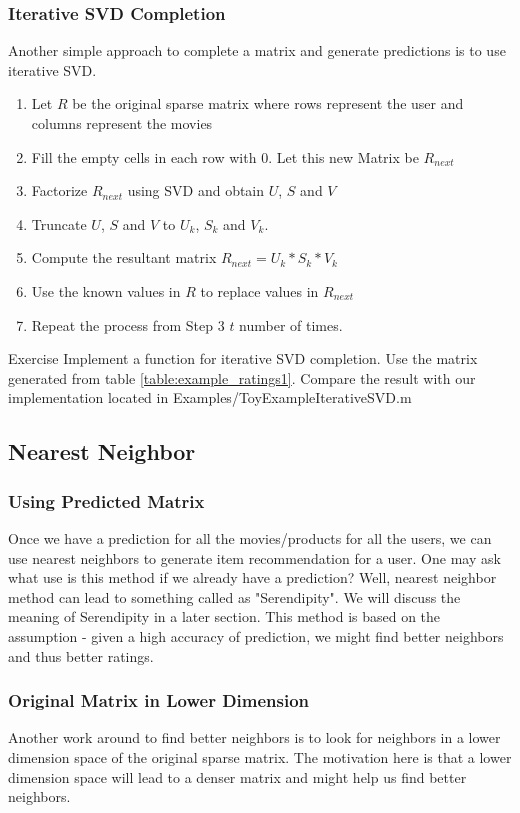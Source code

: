   \subsubsection{Iterative SVD Completion}
  Another simple approach to complete a matrix and generate predictions is to use iterative SVD. 
  \begin{enumerate}
    \item Let $R$ be the original sparse matrix where rows represent the user and columns represent the movies
    \item Fill the empty cells in each row with 0. Let this new Matrix be $R_{next}$
    \item Factorize $R_{next}$ using SVD and obtain $U$, $S$ and $V$
    \item Truncate $U$, $S$ and $V$ to $U_k$, $S_k$ and $V_k$.
    \item Compute the resultant matrix $R_{next} = U_k*S_k*V_k$
    \item Use the known values in $R$ to replace values in $R_{next}$
    \item Repeat the process from Step 3 $t$ number of times.
  \end{enumerate}
\begin{myremark}{Exercise }
Implement a function for iterative SVD completion. Use the matrix generated from table \ref{table:example_ratings1}. Compare the result with our implementation located in Examples/ToyExampleIterativeSVD.m
\end{myremark}
  \subsection{Nearest Neighbor}
  \subsubsection{Using Predicted Matrix}
  Once we have a prediction for all the movies/products for all the users, we can use nearest neighbors to generate item recommendation for a user. One may ask what use is this method if we already have a prediction? Well, nearest neighbor method can lead to something called as "Serendipity". We will discuss the meaning of Serendipity in a later section. This method is based on the assumption - given a high accuracy of prediction, we might find better neighbors and thus better ratings.
  \subsubsection{Original Matrix in Lower Dimension}
  Another work around to find better neighbors is to look for neighbors in a lower dimension space of the original sparse matrix. The motivation here is that a lower dimension space will lead to a denser matrix and might help us find better neighbors.

